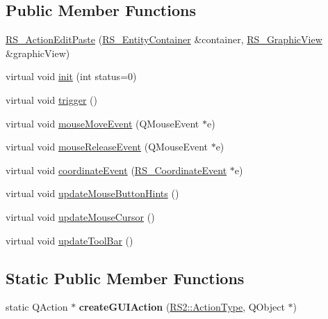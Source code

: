 \subsection*{Public Member Functions}
\begin{DoxyCompactItemize}
\item 
\hyperlink{classRS__ActionEditPaste_a8266345ffa711e2c5f7c3add1e8b825c}{R\-S\-\_\-\-Action\-Edit\-Paste} (\hyperlink{classRS__EntityContainer}{R\-S\-\_\-\-Entity\-Container} \&container, \hyperlink{classRS__GraphicView}{R\-S\-\_\-\-Graphic\-View} \&graphic\-View)
\item 
virtual void \hyperlink{classRS__ActionEditPaste_aba71f496f5330d89ee5827466f074b8e}{init} (int status=0)
\item 
virtual void \hyperlink{classRS__ActionEditPaste_a248285c542bbbdaac44f9d62e7bdd533}{trigger} ()
\item 
virtual void \hyperlink{classRS__ActionEditPaste_aea07419853986589c46d0ff28674db30}{mouse\-Move\-Event} (Q\-Mouse\-Event $\ast$e)
\item 
virtual void \hyperlink{classRS__ActionEditPaste_a64ad2cbda821d4e5cb043b0fffeb3331}{mouse\-Release\-Event} (Q\-Mouse\-Event $\ast$e)
\item 
virtual void \hyperlink{classRS__ActionEditPaste_a24fce8cf0fb82011441c915cf3af9f3f}{coordinate\-Event} (\hyperlink{classRS__CoordinateEvent}{R\-S\-\_\-\-Coordinate\-Event} $\ast$e)
\item 
virtual void \hyperlink{classRS__ActionEditPaste_a4991afac6459a5be5e85d8cfafe78c3a}{update\-Mouse\-Button\-Hints} ()
\item 
virtual void \hyperlink{classRS__ActionEditPaste_aa14d479a654caaf6e59bc9b6b13c756f}{update\-Mouse\-Cursor} ()
\item 
virtual void \hyperlink{classRS__ActionEditPaste_a461cac283cbd5e6f3759f59907320c94}{update\-Tool\-Bar} ()
\end{DoxyCompactItemize}
\subsection*{Static Public Member Functions}
\begin{DoxyCompactItemize}
\item 
\hypertarget{classRS__ActionEditPaste_a039169c06037d04ea1e4ec4cd76040e6}{static Q\-Action $\ast$ {\bfseries create\-G\-U\-I\-Action} (\hyperlink{classRS2_afe3523e0bc41fd637b892321cfc4b9d7}{R\-S2\-::\-Action\-Type}, Q\-Object $\ast$)}\label{classRS__ActionEditPaste_a039169c06037d04ea1e4ec4cd76040e6}

\end{DoxyCompactItemize}
